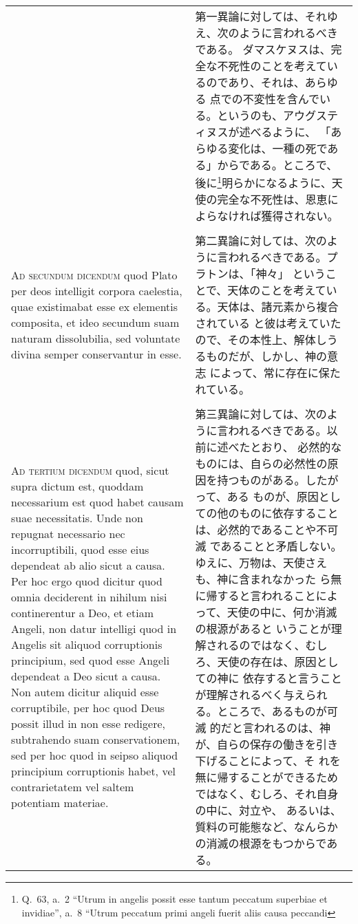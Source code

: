 \documentclass[10pt]{jsarticle} %
\begin{document}
\begin{longtable}{p{21em}p{21em}}
&

第一異論に対しては、それゆえ、次のように言われるべきである。
ダマスケヌスは、完全な不死性のことを考えているのであり、それは、あらゆる
点での不変性を含んでいる。というのも、アウグスティヌスが述べるように、
「あらゆる変化は、一種の死である」からである。ところで、後に\footnote{
Q.~63, a.~2 ``Utrum in angelis possit esse tantum peccatum superbiae et
 invidiae'', a.~8 ``Utrum peccatum primi angeli fuerit aliis causa peccandi
}明らかになるように、天使の完全な不死性は、恩恵によらなければ獲得されない。

\\\\


{\scshape Ad secundum dicendum} quod Plato per deos
intelligit corpora caelestia, quae existimabat esse ex elementis
composita, et ideo secundum suam naturam dissolubilia, sed voluntate
divina semper conservantur in esse.


&

第二異論に対しては、次のように言われるべきである。プラトンは、「神々」
ということで、天体のことを考えている。天体は、諸元素から複合されている
と彼は考えていたので、その本性上、解体しうるものだが、しかし、神の意志
によって、常に存在に保たれている。

\\\\


{\scshape Ad tertium dicendum} quod, sicut supra dictum est, quoddam
necessarium est quod habet causam suae necessitatis. Unde non repugnat
necessario nec incorruptibili, quod esse eius dependeat ab alio sicut
a causa. Per hoc ergo quod dicitur quod omnia deciderent in nihilum
nisi continerentur a Deo, et etiam Angeli, non datur intelligi quod in
Angelis sit aliquod corruptionis principium, sed quod esse Angeli
dependeat a Deo sicut a causa. Non autem dicitur aliquid esse
corruptibile, per hoc quod Deus possit illud in non esse redigere,
subtrahendo suam conservationem, sed per hoc quod in seipso aliquod
principium corruptionis habet, vel contrarietatem vel saltem potentiam
materiae.


 &
 
第三異論に対しては、次のように言われるべきである。以前に述べたとおり、
必然的なものには、自らの必然性の原因を持つものがある。したがって、ある
ものが、原因としての他のものに依存することは、必然的であることや不可滅
であることと矛盾しない。ゆえに、万物は、天使さえも、神に含まれなかった
ら無に帰すると言われることによって、天使の中に、何か消滅の根源があると
いうことが理解されるのではなく、むしろ、天使の存在は、原因としての神に
依存すると言うことが理解されるべく与えられる。ところで、あるものが可滅
的だと言われるのは、神が、自らの保存の働きを引き下げることによって、そ
れを無に帰することができるためではなく、むしろ、それ自身の中に、対立や、
あるいは、質料の可能態など、なんらかの消滅の根源をもつからである。

\end{longtable}
\end{document}

